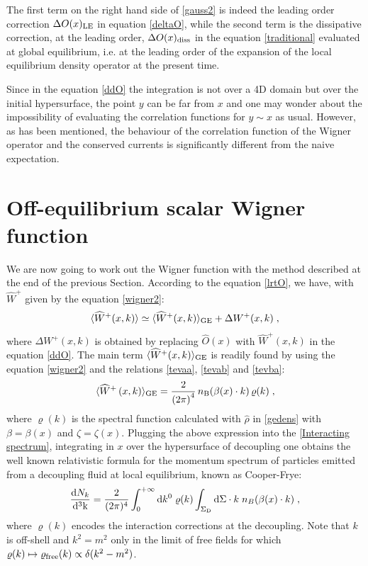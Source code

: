 \documentclass[prd,superscriptaddress,nofootinbib,notitlepage]{revtex4-1}
\def\wrho{{\widehat{\rho}}}
\def\wW{\widehat W}
\def\wO{\widehat O}
\newcommand{\kk}{{\rm k}}
\newcommand{\di}{{\rm d}}
\begin{document}
%
The first term on the right hand side of \eqref{gauss2} is indeed the leading order correction $\Delta O(x)_{\rm LE}$ in 
equation \eqref{deltaO}, while the second term is the dissipative correction, at the leading order, $\Delta O(x)_{\rm diss}$ 
in the equation \eqref{traditional} evaluated at global equilibrium, i.e. at the leading order of the expansion of
the local equilibrium density operator at the present time. 

Since in the equation \eqref{ddO} the integration is not over a 4D domain but over the initial hypersurface, the point 
$y$ can be far from $x$ and one may wonder about the impossibility of evaluating the correlation functions for $y \sim x$ 
as usual. However, as has been mentioned, the behaviour of the correlation function of the Wigner operator and the conserved currents is significantly different from the naive expectation. 


\section{Off-equilibrium scalar Wigner function}
\label{neqwigner}

We are now going to work out the Wigner function with the method described at the end of the previous Section. According to 
the equation \eqref{lrtO}, we have, with $\wW^+$ given by the equation \eqref{wigner2}:
%
\begin{equation*}
    \langle \wW^+(x,k)\rangle \simeq \langle\wW^+(x,k)\rangle_{\rm GE}+ \Delta W^+(x,k)\;,
\end{equation*}
%
where $\Delta W^+(x,k)$ is obtained by replacing $\wO(x)$ with $\wW^+(x,k)$ in the equation 
\eqref{ddO}. The main term $\langle\wW^+(x,k)\rangle_{\rm GE}$ is readily found by using the equation \eqref{wigner2} and the
relations \eqref{tevaa}, \eqref{tevab} and \eqref{tevba}:
%
\begin{equation}\label{leading order W}
    \langle\wW^+\left(x,k\right)\rangle_{\rm GE}=\frac{2}{\left(2\pi\right)^4}\,
    n_{\rm B}(\beta(x)\cdot k) \, \varrho(k)\;,
\end{equation}
%
where $\varrho(k)$ is the spectral function calculated with $\wrho$ in \eqref{gedens} with $\beta=\beta(x)$
and $\zeta=\zeta(x)$. Plugging the above expression into the \eqref{Interacting spectrum}, 
integrating in $x$ over the hypersurface of decoupling one obtains the well known relativistic formula for the momentum 
spectrum of particles emitted from a decoupling fluid at local equilibrium, known as Cooper-Frye:
%
\begin{equation*}
  \frac{\di N_k}{\di^3 \kk} = \frac{2}{(2\pi)^4}\int_0^{+\infty} \di k^0 \; \varrho(k) 
  \int_{\Sigma_{\rm D}} \di\Sigma \cdot k \; n_B (\beta(x) \cdot k)\;,
\end{equation*}
%
where $\varrho(k)$ encodes the interaction corrections at the decoupling. Note that $k$ is off-shell and $k^2=m^2$ only in 
the limit of free fields for which $\varrho(k)\mapsto\varrho_{\rm free}(k)\propto\delta(k^2-m^2)$.
\end{document}
